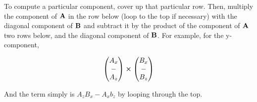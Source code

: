 To compute a particular component, cover up that particular row. Then, multiply the component 
of \(\boldsymbol{\mathbf{A}}\) in the row below (loop to the top if necessary) 
with the diagonal component of \(\boldsymbol{\mathbf{B}}\) and
subtract it by the product of the component of \(\boldsymbol{\mathbf{A}}\) two rows below, and the
diagonal component of \(\boldsymbol{\mathbf{B}}\). For example, for the y-component,

\[
\begin{pmatrix}
    A_x \\
    - \\
    A_z
\end{pmatrix} \cp
%
\begin{pmatrix}
    B_x \\
    - \\
    B_z
\end{pmatrix}
%
\]

And the term simply is \(A_zB_x - A_xb_z\) by looping through the top.